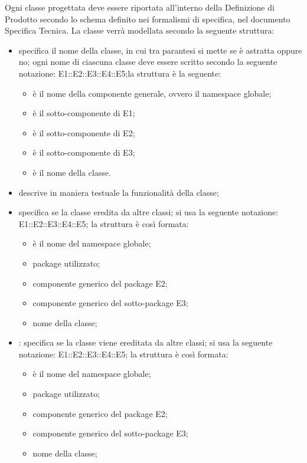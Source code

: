 \label{}
Ogni classe progettata deve essere riportata all'interno della Definizione di Prodotto secondo lo schema definito nei formalismi di specifica, nel documento Specifica Tecnica. La classe verrà modellata secondo la seguente struttura:
\begin{itemize}
\item {}specifica il nome della classe, in cui tra parantesi si mette se è astratta oppure no; ogni nome di ciascuna classe deve essere scritto secondo la seguente notazione: E1::E2::E3::E4::E5;la struttura è la seguente: 
\begin{itemize}
\item {}è il nome della componente generale, ovvero il namespace globale;
\item {}è il sotto-componente di E1;
\item {}è il sotto-componente di E2;
\item {}è il sotto-componente di E3; 
\item {}è il nome della classe.
\end{itemize}
\item {}descrive in maniera testuale la funzionalità della classe;
\item {}specifica se la classe eredita da altre classi; si usa la seguente notazione: E1::E2::E3::E4::E5; la struttura è così formata:
	\begin{itemize}
	\item {}è il nome del namespace globale;
	\item {}package utilizzato;
	\item {}componente generico del package E2;
	\item {}componente generico del sotto-package E3;
	\item {}nome della classe;
	\end{itemize}
\item {}: specifica se la classe viene ereditata da altre classi; si usa la seguente notazione: E1::E2::E3::E4::E5; la struttura è così formata:
	\begin{itemize}
	\item {}è il nome del namespace globale;
	\item {}package utilizzato;
	\item {}componente generico del package E2;
	\item {}componente generico del sotto-package E3;
	\item {}nome della classe;
	\end{itemize}
\end{itemize}

